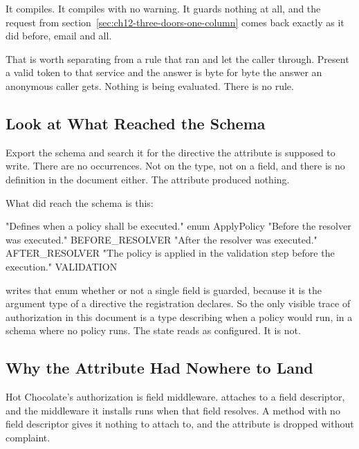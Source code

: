 %
It compiles. It compiles with no warning. It guards nothing at all, and the
request from section~\ref{sec:ch12-three-doors-one-column} comes back exactly
as it did before, email and all.

%
That is worth separating from a rule that ran and let the caller through.
Present a valid token to that service and the answer is byte for byte the
answer an anonymous caller gets. Nothing is being evaluated. There is no
rule.

\subsection{Look at What Reached the Schema}

%
Export the schema and search it for the directive the attribute is supposed
to write. There are no occurrences. Not on the type, not on a field, and
there is no  definition in the document either.
The attribute produced nothing.

%
What did reach the schema is this:

\begin{graphqlsdl}[fontsize=\footnotesize]
"Defines when a policy shall be executed."
enum ApplyPolicy {
  "Before the resolver was executed."
  BEFORE_RESOLVER
  "After the resolver was executed."
  AFTER_RESOLVER
  "The policy is applied in the validation step before the execution."
  VALIDATION
}
\end{graphqlsdl}

%
 writes that enum whether or not a single field is
guarded, because it is the argument type of a directive the registration
declares. So the only visible trace of authorization in this document is a
type describing when a policy would run, in a schema where no policy runs.
The state reads as configured. It is not.

\subsection{Why the Attribute Had Nowhere to Land}

%
Hot Chocolate's authorization is field middleware. \code{[Authorize]}
attaches to a field descriptor, and the middleware it installs runs when that
field resolves. A method with no field descriptor gives it nothing to attach
to, and the attribute is dropped without complaint.

